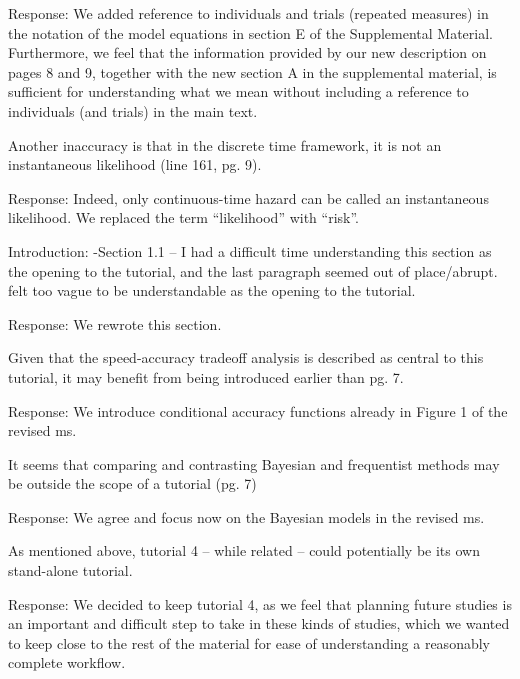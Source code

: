 \documentclass[
]{article}
\renewenvironment{quote}{\begin{leftbar}}{\end{leftbar}}
\begin{document}
Response: We added reference to individuals and trials (repeated
measures) in the notation of the model equations in section E of the
Supplemental Material. Furthermore, we feel that the information
provided by our new description on pages 8 and 9, together with the new
section A in the supplemental material, is sufficient for understanding
what we mean without including a reference to individuals (and trials)
in the main text.

\begin{quote}
Another inaccuracy is that in the discrete time framework, it is not an
instantaneous likelihood (line 161, pg. 9).
\end{quote}

Response: Indeed, only continuous-time hazard can be called an
instantaneous likelihood. We replaced the term ``likelihood'' with
``risk''.

\begin{quote}
Introduction: -Section 1.1 -- I had a difficult time understanding this
section as the opening to the tutorial, and the last paragraph seemed
out of place/abrupt. felt too vague to be understandable as the opening
to the tutorial.
\end{quote}

Response: We rewrote this section.

\begin{quote}
Given that the speed-accuracy tradeoff analysis is described as central
to this tutorial, it may benefit from being introduced earlier than pg.
7.
\end{quote}

Response: We introduce conditional accuracy functions already in Figure
1 of the revised ms.

\begin{quote}
It seems that comparing and contrasting Bayesian and frequentist methods
may be outside the scope of a tutorial (pg. 7)
\end{quote}

Response: We agree and focus now on the Bayesian models in the revised
ms.

\begin{quote}
As mentioned above, tutorial 4 -- while related -- could potentially be
its own stand-alone tutorial.
\end{quote}

Response: We decided to keep tutorial 4, as we feel that planning future
studies is an important and difficult step to take in these kinds of
studies, which we wanted to keep close to the rest of the material for
ease of understanding a reasonably complete workflow.
\end{document}
